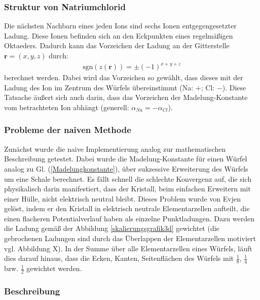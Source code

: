 \documentclass[10pt,a4paper]{article}
\begin{document}
\subsubsection{Struktur von Natriumchlorid}

Die nächsten Nachbarn eines jeden Ions sind sechs Ionen entgegengesetzter
Ladung. Diese Ionen befinden sich an den Eckpunkten eines regelmäßigen
Oktaeders. Dadurch kann das Vorzeichen der Ladung an der Gitterstelle
$\mathbf{r} = \left( x,y,z \right)$ durch:
\begin{align}
\mathrm{sgn}\left(z(\mathbf{r})\right) = \pm \left( -1 \right)^{x+y+z}
\end{align}
berechnet werden. Dabei wird das Vorzeichen so gewählt, dass dieses mit der Ladung
des Ion im Zentrum des Würfels übereinstimmt (Na: $+$; Cl: $-$). Diese Tatsache
äußert sich auch darin, dass das Vorzeichen der Madelung-Konstante vom
betrachteten Ion abhängt (generell: $\alpha_{Na} = - \alpha_{Cl}$).
\subsubsection{Probleme der naiven Methode}

Zunächst wurde die naive Implementierung analog zur mathematischen Beschreibung
getestet. Dabei wurde die Madelung-Konstante für einen Würfel analog zu
Gl. (\ref{Madelungkonstante}), über sukzessive Erweiterung des Würfels um eine
Schale berechnet. Es fällt schnell die schlechte Konvergenz auf, die sich
physikalisch darin manifestiert, dass der Kristall, beim einfachen Erweitern
mit einer Hülle, nicht elektrisch neutral bleibt. Dieses Problem wurde von Evjen
\cite{Evjen} gelöst, indem er den Kristall in elektrisch neutrale Elementarzellen
aufteilt, die einen flacheren Potentialverlauf haben als einzelne Punktladungen.
Dazu werden die Ladung gemäß der Abbildung \ref{skalierungsgrafik3d} gewichtet
(die gebrochenen Ladungen sind durch das Überlappen der Elementarzellen motiviert
vgl. Abbildung X). In der Summe über alle Elementarzellen eines Würfels, läuft
dies darauf hinaus, dass die Ecken, Kanten, Seitenflächen des Würfels mit
$\frac{1}{8}$, $\frac{1}{4}$ bzw. $\frac{1}{2}$ gewichtet werden.

\subsubsection{Beschreibung}
\end{document}

